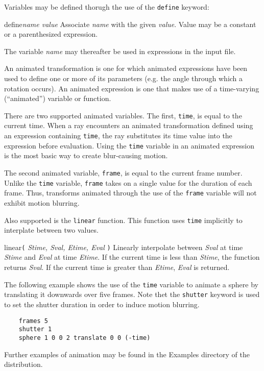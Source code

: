 Variables may be defined thorugh the use of the {\tt define} keyword:

\begin{defkey}{define}{{\em name value}}
	Associate {\em name} with the given {\em value}.  Value may
	be a constant or a parenthesized expression.
\end{defkey}
The variable {\em name} may thereafter be used in expressions in the
input file.

An animated transformation is one for which animated expressions have
been used to define one or more of its parameters (e.g. the angle through
which a rotation occurs).  An animated expression is one that makes
use of a time-varying (``animated'') variable or function.

There are two supported animated variables.
The first, {\tt time}, is equal to the current time.
When a ray encounters an animated
transformation defined using an expression containing {\tt time}, the ray
substitutes its time value into the expression before evaluation.
Using the {\tt time} variable in an animated expression is the most
basic way to create blur-causing motion.

The second animated variable, {\tt frame}, is equal to the current
frame number.  Unlike the {\tt time} variable, {\tt frame} takes on
a single value for the duration of each frame.  Thus, transforms
animated through the use of the {\tt frame} variable will not exhibit
motion blurring.

Also supported is the {\tt linear} function.  This function uses
{\tt time} implicitly to interplate between two values.

\begin{defkey}{linear}{{\tt (} {\em Stime, Sval, Etime, Eval} {\tt )}}
	Linearly interpolate between {\em Sval} at time
	{\em Stime} and {\em Eval} at time {\em Etime}.
	If the current time is less than {\em Stime}, the function
	returns {\em Sval}.  If the current time is greater than
	{\em Etime}, {\em Eval} is returned.
\end{defkey}

The following example shows the use of the {\tt time} variable to
animate a sphere by translating it downwards over five frames.
Note thet the {\tt shutter} keyword is used to set the shutter duration
in order to induce motion blurring.

\begin{verbatim}
    frames 5
    shutter 1
    sphere 1 0 0 2 translate 0 0 (-time)
\end{verbatim}

Further examples of animation may be found in the Examples directory
of the {\rayshade} distribution.
